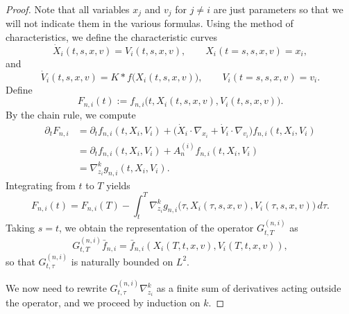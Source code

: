 \documentclass[pdflatex,sn-mathphys-num]{sn-jnl}
\theoremstyle{thmstyleone}%
\theoremstyle{thmstyletwo}%
\theoremstyle{thmstylethree}%
\begin{document}
\begin{proof}
Note that all variables $x_j$ and $v_j$ for $j\neq i$ are just parameters so that we will not indicate them in the various formulas. Using the method of characteristics, we define the characteristic curves
\[
\dot{X}_i(t,s,x,v) = V_i(t,s,x,v),
\qquad
X_i(t=s,s,x,v)=x_i,
\]
and
\[
\dot{V}_i(t,s,x,v) = K * f \bigl(X_i(t,s,x,v)\bigr),
\qquad
V_i(t=s,s,x,v) = v_i.
\]
Define
\[
F_{n,i}(t) := f_{n,i}\bigl(t, X_i(t,s,x,v), V_i(t,s,x,v)\bigr).
\]
By the chain rule, we compute
\begin{align*}
\partial_t F_{n,i}
&=
\partial_t f_{n,i}(t,X_i,V_i)
+
\bigl(\dot X_i\cdot\nabla_{x_i}
+
\dot V_i\cdot\nabla_{v_i}\bigr)
f_{n,i}(t,X_i,V_i) \\
&=
\partial_t f_{n,i}(t,X_i,V_i)
+
A_n^{(i)} f_{n,i}(t,X_i,V_i) \\
&=
\nabla_{z_i}^k g_{n,i}(t,X_i,V_i).
\end{align*}
Integrating from $t$ to $T$ yields
\[
F_{n,i}(t)
=
F_{n,i}(T)
-
\int_t^T
\nabla_{z_i}^k g_{n,i}\bigl(\tau, X_i(\tau,s,x,v), V_i(\tau,s,x,v)\bigr)\,d\tau.
\]
Taking $s=t$, we obtain the representation of the operator $G^{(n,i)}_{t,T}$ as
\[
G^{(n,i)}_{t,T} \bar f_{n,i}=\bar f_{n,i}(X_i(T,t,x,v),V_i(T,t,x,v)),
\]
so that $G^{(n,i)}_{t,\tau}$ is naturally bounded on $L^2$.

\noindent
We now need to rewrite $G^{(n,i)}_{t,\tau}\nabla_{z_i}^k$ as a finite sum of
derivatives acting outside the operator, and we proceed by induction on $k$.


\end{proof}
\end{document}
